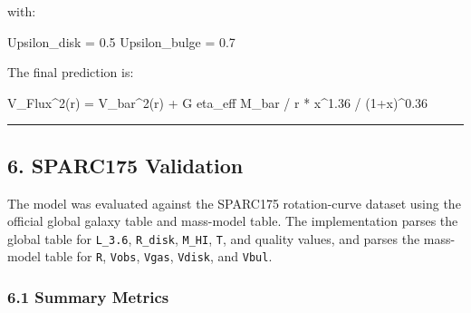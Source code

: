 \documentclass[
]{article}
\newenvironment{Shaded}{}{}
\newcommand{\NormalTok}[1]{#1}
\begin{document}
with:

\begin{Shaded}
\begin{Highlighting}[]
\NormalTok{Upsilon\_disk = 0.5}
\NormalTok{Upsilon\_bulge = 0.7}
\end{Highlighting}
\end{Shaded}

The final prediction is:

\begin{Shaded}
\begin{Highlighting}[]
\NormalTok{V\_Flux\^{}2(r) = V\_bar\^{}2(r) + G eta\_eff M\_bar / r * x\^{}1.36 / (1+x)\^{}0.36}
\end{Highlighting}
\end{Shaded}

\begin{center}\rule{0.5\linewidth}{0.5pt}\end{center}

\subsection{6. SPARC175 Validation}\label{sparc175-validation}

The model was evaluated against the SPARC175 rotation-curve dataset
using the official global galaxy table and mass-model table. The
implementation parses the global table for \texttt{L\_3.6},
\texttt{R\_disk}, \texttt{M\_HI}, \texttt{T}, and quality values, and
parses the mass-model table for \texttt{R}, \texttt{Vobs},
\texttt{Vgas}, \texttt{Vdisk}, and \texttt{Vbul}.

\subsubsection{6.1 Summary Metrics}\label{summary-metrics}
\end{document}
